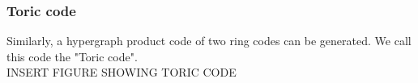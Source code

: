 \subsubsection{Toric code}
Similarly, a hypergraph product code of two ring codes can be 
generated. We call this code the "Toric code".\\
INSERT FIGURE SHOWING TORIC CODE